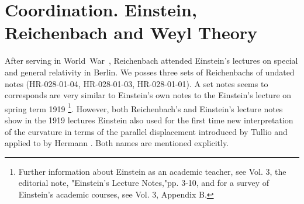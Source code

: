 \documentclass[draft]{article}
\begin{document}






\section{Coordination. Einstein, Reichenbach and Weyl Theory}
\label{Coordination}
After serving in World~War~, Reichenbach attended Einstein's lectures on special and general relativity in Berlin. We posses three sets of Reichenbachs of undated notes (HR-028-01-04, HR-028-01-03, HR-028-01-01). A set notes seems to corresponds are very similar to Einstein's own notes to the Einstein's lecture on spring term 1919 \citep{Einstein1919c}\footnote{Further information about Einstein as an academic teacher, see Vol. 3, the editorial note, "Einstein's Lecture Notes,"pp. 3-10, and for a survey of Einstein's academic courses, see Vol. 3, Appendix B.}.  However, both Reichenbach's and Einstein's lecture notes show in the 1919 lectures Einstein also used for the first time new interpretation of the curvature in terms of the parallel displacement introduced by Tullio \citet{Levi-Civita1916} and applied to \rt by Hermann \citet{Weyl1918}. Both names are mentioned explicitly. 
\end{document}

